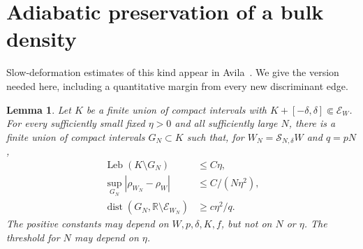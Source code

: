 \documentclass[11pt,a4paper]{article}
\numberwithin{equation}{section}
\newtheorem{lemma}[theorem]{Lemma}
\theoremstyle{remark}
\newcommand{\R}{\mathbb R}
\newcommand{\dist}{\operatorname{dist}}
\newcommand{\Leb}{\operatorname{Leb}}
\begin{document}
\section{Adiabatic preservation of a bulk density}
Slow-deformation estimates of this kind appear in
Avila~\cite[Lemmas~2.11--2.12]{Avila}. We give the version
needed here, including a quantitative margin from every
new discriminant edge.

\begin{lemma}\label{lem:bulk}
Let $K$ be a finite union of compact intervals with
$K+[-\delta,\delta]\Subset\mathcal E_W$.
For every sufficiently small fixed $\eta>0$ and all sufficiently
large $N$, there is a finite union of compact intervals
$G_N\subset K$ such that, for $W_N=\mathcal S_{N,\delta}W$ and
$q=pN$,
\begin{align}
\Leb(K\setminus G_N)&\le C\eta,\label{eq:loss}\\
\sup_{G_N}|\rho_{W_N}-\rho_W|&\le C/(N\eta^2),\label{eq:rho}\\
\dist(G_N,\R\setminus\mathcal E_{W_N})&\ge c\eta^2/q.
\label{eq:margin}
\end{align}
The positive constants may depend on $W,p,\delta,K,f$, but not
on $N$ or $\eta$. The threshold for $N$ may depend on $\eta$.
\end{lemma}
\end{document}

